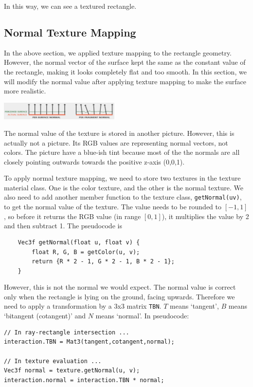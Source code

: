 \documentclass[acmtog]{acmart}
\begin{document}
In this way, we can see a textured rectangle.

\subsection{Normal Texture Mapping}

In the above section, we applied texture mapping to the rectangle geometry. However, the normal vector of the surface kept the same as the constant value of the rectangle, making it looks completely flat and too smooth. In this section, we will modify the normal value after applying texture mapping to make the surface more realistic.

\begin{center}
	\includegraphics[width=0.45\textwidth]{pictures/normal-texture.jpg}
\end{center}

The normal value of the texture is stored in another picture. However, this is actually not a picture. Its RGB values are representing normal vectors, not colors. The picture have a blue-ish tint because most of the the normals are all closely pointing outwards towards the positive z-axis (0,0,1). 

To apply normal texture mapping, we need to store two textures in the texture material class. One is the color texture, and the other is the normal texture. We also need to add another member function to the texture class, \verb|getNormal(uv)|, to get the normal value of the texture. The value needs to be rounded to $[-1, 1]$, so before it returns the RGB value (in range $[0, 1]$), it multiplies the value by 2 and then subtract 1. The pseudocode is 

\begin{lstlisting}
	Vec3f getNormal(float u, float v) {
		float R, G, B = getColor(u, v);
		return {R * 2 - 1, G * 2 - 1, B * 2 - 1};
	}
\end{lstlisting}

However, this is not the normal we would expect. The normal value is correct only when the rectangle is lying on the ground, facing upwards. Therefore we need to apply a transformation by a 3x3 matrix \verb|TBN|. $T$ means `tangent', $B$ means `bitangent (cotangent)' and $N$ means `normal'. In pseudocode: 

\begin{lstlisting}
// In ray-rectangle intersection ...
interaction.TBN = Mat3(tangent,cotangent,normal);

// In texture evaluation ...
Vec3f normal = texture.getNormal(u, v);
interaction.normal = interaction.TBN * normal;
\end{lstlisting}
\end{document}
